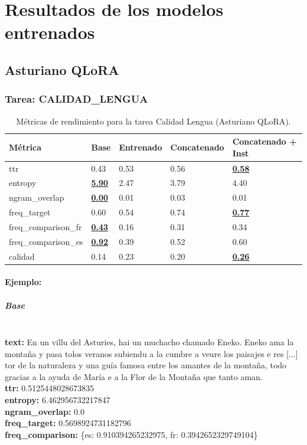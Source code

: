 \chapter{Resultados de los modelos entrenados}

\section{Asturiano QLoRA}

\subsection{Tarea: CALIDAD\_LENGUA}\label{tarea-calidad_lengua}
\begin{longtable}[]{@{}lllll@{}}
\toprule\noalign{}
Métrica & Base & Entrenado & Concatenado & Concatenado + Inst \\
\midrule\noalign{}
\endhead
\bottomrule\noalign{}
\caption{Métricas de rendimiento para la tarea Calidad Lengua (Asturiano QLoRA).}
\label{tab:metricas_calidad_lengua_Asturiano QLoRA}
\endlastfoot
ttr & 0.43 & 0.53 & 0.56 & \textbf{\underline{0.58}} \\
entropy & \textbf{\underline{5.90}} & 2.47 & 3.79 & 4.40 \\
ngram\_overlap & \textbf{\underline{0.00}} & 0.01 & 0.03 & 0.01 \\
freq\_target & 0.60 & 0.54 & 0.74 & \textbf{\underline{0.77}} \\
freq\_comparison\_fr & \textbf{\underline{0.43}} & 0.16 & 0.31 & 0.34 \\
freq\_comparison\_es & \textbf{\underline{0.92}} & 0.39 & 0.52 & 0.60 \\
calidad & 0.14 & 0.23 & 0.20 & \textbf{\underline{0.26}} \\
\end{longtable}

\subsubsection{Ejemplo:}

\paragraph{Base}~\\
\textbf{text:} En un villu del Asturies, hai un muchacho chamado Eneko. Eneko ama la montaña y pasa tolos veranos subiendu a la cumbre a veure los paisajes e res [...] tor de la naturaleza y una guía famosa entre los amantes de la montaña, todo gracias a la ayuda de María e a la Flor de la Montaña que tanto aman.\\
\textbf{ttr:} 0.5125448028673835\\
\textbf{entropy:} 6.462956732217847\\
\textbf{ngram\_overlap:} 0.0\\
\textbf{freq\_target:} 0.5698924731182796\\
\textbf{freq\_comparison:} \{\textquotesingle{}es\textquotesingle{}: 0.910394265232975, \textquotesingle{}fr\textquotesingle{}: 0.3942652329749104\}

